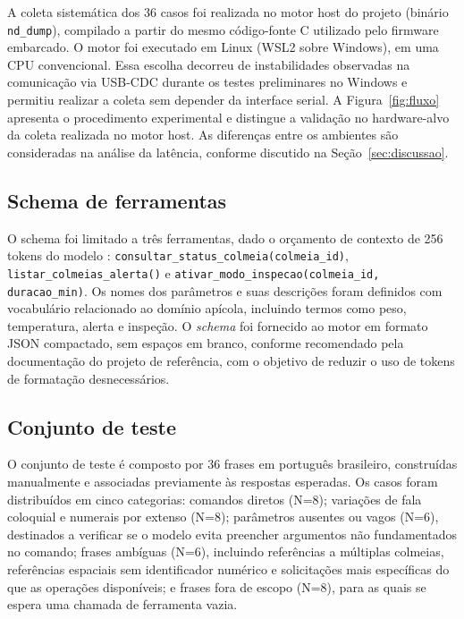 \documentclass[12pt]{article}
\begin{document}
A coleta sistemática dos 36 casos foi realizada no motor host do projeto
(binário \texttt{nd\_dump}), compilado a partir do mesmo código-fonte C
utilizado pelo firmware embarcado. O motor foi executado em Linux (WSL2
sobre Windows), em uma CPU convencional. Essa escolha decorreu de
instabilidades observadas na comunicação via USB-CDC durante os testes
preliminares no Windows e permitiu realizar a coleta sem depender da
interface serial. A Figura~\ref{fig:fluxo} apresenta o procedimento
experimental e distingue a validação no hardware-alvo da coleta realizada
no motor host. As diferenças entre os ambientes são consideradas na
análise da latência, conforme discutido na
Seção~\ref{sec:discussao}.


\subsection{Schema de ferramentas}

O schema foi limitado a três ferramentas, dado o orçamento de contexto de
256 tokens do modelo \cite{ndubuaku2026controlled}:
\texttt{consultar\_status\_colmeia(colmeia\_id)},
\texttt{listar\_colmeias\_alerta()} e
\texttt{ativar\_modo\_inspecao(colmeia\_id, duracao\_min)}. Os nomes dos parâmetros e suas descrições foram definidos com vocabulário
relacionado ao domínio apícola, incluindo termos como peso, temperatura,
alerta e inspeção. O \textit{schema} foi fornecido ao motor em formato
JSON compactado, sem espaços em branco, conforme recomendado pela
documentação do projeto de referência, com o objetivo de reduzir o uso de
tokens de formatação desnecessários.

\subsection{Conjunto de teste}

O conjunto de teste é composto por 36 frases em português brasileiro,
construídas manualmente e associadas previamente às respostas esperadas.
Os casos foram distribuídos em cinco categorias: comandos diretos (N=8);
variações de fala coloquial e numerais por extenso (N=8); parâmetros
ausentes ou vagos (N=6), destinados a verificar se o modelo evita
preencher argumentos não fundamentados no comando; frases ambíguas
(N=6), incluindo referências a múltiplas colmeias, referências espaciais
sem identificador numérico e solicitações mais específicas do que as
operações disponíveis; e frases fora de escopo (N=8), para as quais se
espera uma chamada de ferramenta vazia.
\end{document}
